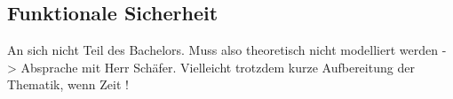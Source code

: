 \documentclass[../../../Bachelorarbeit.tex]{subfiles}
\begin{document}
\subsection{Funktionale Sicherheit} \label{sicherheit}
\color{red}
An sich nicht Teil des Bachelors. Muss also theoretisch nicht modelliert werden -> Absprache mit Herr Schäfer. Vielleicht trotzdem kurze Aufbereitung der Thematik, wenn Zeit !
\end{document}
